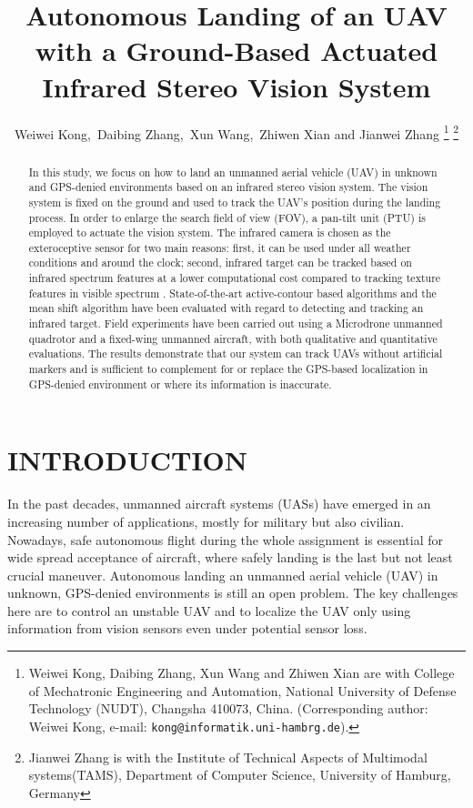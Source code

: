 \documentclass[letterpaper, 10 pt, conference]{ieeeconf}  %
\title{\LARGE \bf
Autonomous Landing of an UAV with a Ground-Based Actuated Infrared Stereo Vision System}
\author{Weiwei Kong,\ Daibing Zhang,\ Xun Wang,\ Zhiwen Xian and Jianwei Zhang%
\thanks{Weiwei Kong, Daibing Zhang, Xun Wang and Zhiwen Xian are with College of Mechatronic Engineering and Automation, National University of Defense Technology (NUDT), Changsha 410073, China. (Corresponding author: Weiwei Kong, e-mail:  {\tt\small kong@informatik.uni-hambrg.de}).
       }%
\thanks{Jianwei Zhang is with the Institute of Technical Aspects of Multimodal systems(TAMS), Department of Computer Science, University of Hamburg, Germany}%
}
\begin{document}
\maketitle
\thispagestyle{empty}
\pagestyle{empty}

\begin{abstract}

In this study, we focus on how to land an unmanned aerial vehicle (UAV) in unknown and GPS-denied environments based on an infrared stereo vision system. The vision system is fixed on the ground and used to track the UAV's position during the landing process. In order to enlarge the search field of view (FOV), a pan-tilt unit (PTU) is employed to actuate the vision system. The infrared camera is chosen as the exteroceptive sensor for two main reasons: first, it can be used under all weather conditions and around the clock; second, infrared target can be tracked based on infrared spectrum features at a lower computational cost compared to tracking texture features in visible spectrum . State-of-the-art active-contour based algorithms and the mean shift algorithm have been evaluated with regard to detecting and tracking an infrared target. Field experiments have been carried out using a Microdrone unmanned quadrotor and a fixed-wing unmanned aircraft, with both qualitative and quantitative evaluations. The results demonstrate that our system can track UAVs without artificial markers and is sufficient to complement for or replace the GPS-based localization in GPS-denied environment or where its information is inaccurate.

\end{abstract}


\section{INTRODUCTION}

In the past decades, unmanned aircraft systems (UASs) have emerged in an increasing number of applications, mostly for military but also civilian. Nowadays, safe autonomous flight during the whole assignment is essential for wide spread acceptance of aircraft, where safely landing is the last but not least crucial maneuver. Autonomous landing an unmanned aerial vehicle (UAV) in unknown, GPS-denied environments is still an open problem. The key challenges here are to control an unstable UAV and to localize the UAV only using information from vision sensors even under potential sensor loss.
\end{document}
